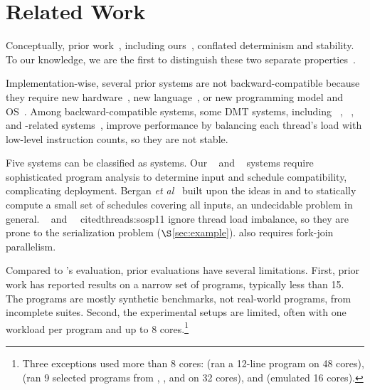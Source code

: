 
\chapter{Related Work} \label{sec:related}

  Conceptually, prior
work~\cite{dthreads:sosp11, cui:tern:osdi10, peregrine:sosp11,
  determinator:osdi10}, including ours~\cite{cui:tern:osdi10,
  peregrine:sosp11}, conflated determinism and stability.  To our
knowledge, we are the first to distinguish these two separate
properties~\cite{smt:cacm,smt:hotpar13}.

Implementation-wise, several prior systems are not backward-compatible
because they require new hardware~\cite{dmp:asplos09}, new
language~\cite{dpj:oopsla09}, or new programming model and
OS~\cite{determinator:osdi10}.  Among backward-compatible systems, some
DMT systems, including \kendo~\cite{kendo:asplos09},
\coredet~\cite{coredet:asplos10}, and \coredet-related
systems~\cite{dos:osdi10, ddos:asplos13}, improve performance by balancing
each thread's load with low-level instruction counts, so they are not
stable.

Five systems can be classified as \smt systems.  Our
\tern~\cite{cui:tern:osdi10} and \peregrine~\cite{peregrine:sosp11} systems
require sophisticated program analysis to determine input and schedule
compatibility, complicating deployment. Bergan {\it et
  al}~\cite{bergan:oopsla13} built upon the ideas in \tern and \peregrine
to statically compute a small set of schedules covering all inputs, an
undecidable problem in general.  \grace~\cite{grace:oopsla09} and \dthreads~\
cite{dthreads:sosp11} ignore thread load
imbalance, so they are prone to the serialization problem
($\S$\ref{sec:example}). \grace also requires
fork-join parallelism.

Compared to \parrot's evaluation, prior evaluations have several limitations.
First, prior work has reported results on a narrow set of programs,
typically less than 15.  The programs are mostly synthetic benchmarks, not
real-world programs, from incomplete suites.  Second, the experimental
setups are limited, often with one workload per program and up to 8
cores.\footnote{Three exceptions used more than 8 cores:
  \cite{kendo:wodet11} (ran a 12-line program on 48 cores),
  \cite{aviram:thesis} (ran 9 selected programs from \parsec, \splashx, and
  \npb on 32 cores), and \cite{dmp:asplos09} (emulated 16 cores).}

